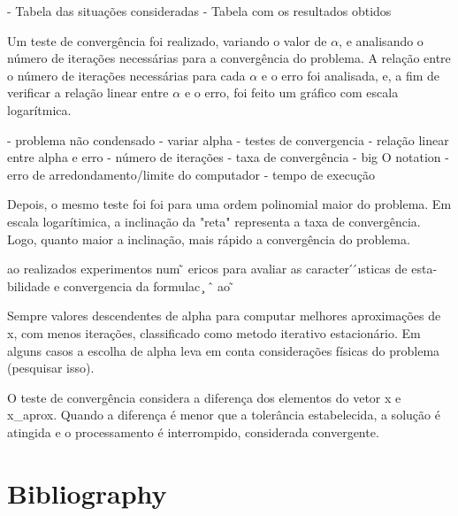 \documentclass[12pt]{article}
\begin{document}
- Tabela das situações consideradas
- Tabela com os resultados obtidos

Um teste de convergência foi realizado, variando o valor de \(\alpha\), e analisando o número de iterações necessárias para a convergência do 
problema. A relação
entre o número de iterações necessárias para cada \(\alpha\) e o erro foi analisada, e, a fim de verificar a relação linear entre \(\alpha\) e o erro, foi feito um gráfico
com escala logarítmica.

- problema não condensado
- variar alpha
- testes de convergencia
- relação linear entre alpha e erro
- número de iterações
- taxa de convergência 
- big O notation
- erro de arredondamento/limite do computador
- tempo de execução 

Depois, o mesmo teste foi foi para uma ordem polinomial maior do problema. 
Em escala logarítimica, a inclinação da "reta" representa a taxa de convergência. Logo, quanto maior a inclinação, mais rápido a convergência do problema. 

ao realizados experimentos num  ̃ ericos para avaliar as caracter  ́  ́ısticas de esta-
bilidade e convergencia da formulac ̧ ˆ ao ̃

Sempre valores descendentes de alpha para computar melhores aproximações de x, com menos iterações, classificado como metodo iterativo estacionário. Em alguns casos a escolha de alpha leva em conta considerações físicas do problema (pesquisar isso).

O teste de convergência considera a diferença dos elementos do vetor x e x_aprox. Quando a diferença é menor que a tolerância estabelecida,
a solução é atingida e o processamento é interrompido, considerada convergente. 

\section{Bibliography}
\end{document}
